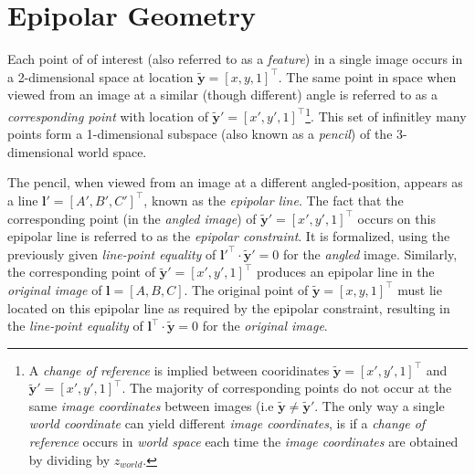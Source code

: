 \section{Epipolar Geometry}

\par Each point of of interest (also referred to as a \textit{feature}) in a single image occurs in a 2-dimensional space at location $\mathbf{\tilde{y}}=[x,y,1]^\intercal$. The same point in space when viewed from an image at a similar (though different) angle is referred to as a \textit{corresponding point} with location of $\mathbf{\tilde{y}'}=[x',y',1]^\intercal$\footnote{A \textit{change of reference} is implied between cooridinates $\mathbf{\tilde{y}}=[x', y', 1]^\intercal$ and $\mathbf{\tilde{y}'}=[x', y', 1]^\intercal$. The majority of corresponding points do not occur at the same \textit{image coordinates} between images (i.e $\mathbf{\tilde{y}}\neq\mathbf{\tilde{y}'}$. The only way a single \textit{world coordinate} can yield different \textit{image coordinates}, is if a \textit{change of reference} occurs in \textit{world space} each time the \textit{image coordinates} are obtained by dividing by $z_{world}$.}. This set of infinitley many points form a 1-dimensional subspace (also known as a \textit{pencil}) of the 3-dimensional world space.

\par The pencil, when viewed from an image at a different angled-position, appears as a line $\mathbf{l'}=[A',B',C']^\intercal$, known as the \textit{epipolar line}. The fact that the corresponding point (in the \textit{angled image}) of $\mathbf{\tilde{y}'}=[x',y',1]^\intercal$ occurs on this epipolar line is referred to as the \textit{epipolar constraint}. It is formalized, using the previously given \textit{line-point equality} of $\mathbf{l'}^\intercal\cdot\mathbf{\tilde{y}'}=0$ for the \textit{angled} image. Similarly, the corresponding point of $\mathbf{\tilde{y}'}=[x',y',1]^\intercal$ produces an epipolar line in the \textit{original image} of $\mathbf{l}=[A,B,C]$. The original point of $\mathbf{\tilde{y}}=[x,y,1]^\intercal$ must lie located on this epipolar line as required by the epipolar constraint, resulting in the \textit{line-point equality} of $\mathbf{l}^\intercal\cdot\mathbf{\tilde{y}}=0$ for the \textit{original image}. 

